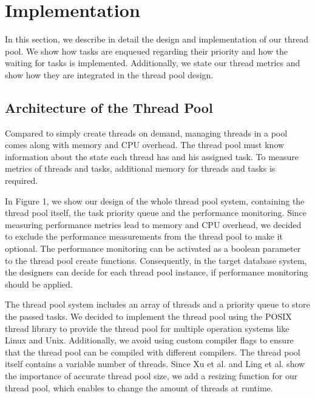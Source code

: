\documentclass[conference]{IEEEtran}
\begin{document}
\section{Implementation}
In this section, we describe in detail the design and implementation of our thread pool. We show how tasks are enqueued regarding their priority and how the waiting for tasks is implemented. Additionally, we state our thread metrics and show how they are integrated in the thread pool design.

\subsection{Architecture of the Thread Pool}
Compared to simply create threads on demand, managing threads in a pool comes along with memory and CPU overhead. The thread pool must know information about the state each thread has and his assigned task. To measure metrics of threads and tasks, additional memory for threads and tasks is required.

In Figure 1, we show our design of the whole thread pool system, containing the thread pool itself, the task priority queue and the performance monitoring. Since measuring performance metrics lead to memory and CPU overhead, we decided to exclude the performance measurements from the thread pool to make it optional. The performance monitoring can be activated as a boolean parameter to the thread pool create functions. Consequently, in the target database system, the designers can decide for each thread pool instance, if performance monitoring should be applied.

The thread pool system includes an array of threads and a priority queue to store the passed tasks. We decided to implement the thread pool using the POSIX thread library to provide the thread pool for multiple operation systems like Linux and Unix. Additionally, we avoid using custom compiler flags to ensure that the thread pool can be compiled with different compilers. The thread pool itself contains a variable number of threads. Since Xu et al. \cite{xu2004performance} and Ling et al. \cite{ling2000analysis} show the importance of accurate thread pool size, we add a resizing function for our thread pool, which enables to change the amount of threads at runtime.
\end{document}
